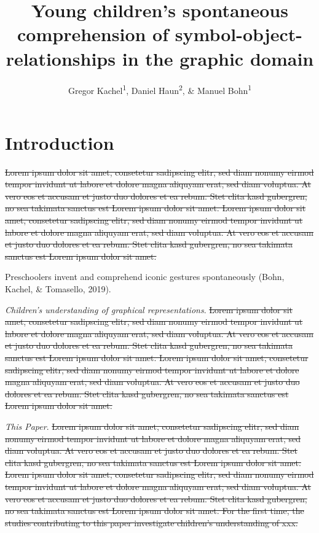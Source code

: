 \documentclass[
  man]{apa6}
\title{Young children's spontaneous comprehension of symbol-object-relationships in the graphic domain}
\author{Gregor Kachel\textsuperscript{1}, Daniel Haun\textsuperscript{2}, \& Manuel Bohn\textsuperscript{1}}
\date{}
\affiliation{\vspace{0.5cm}\textsuperscript{1} Leuphana University\\\textsuperscript{2} Max-Planck-Institute for Evolutionary Anthropology}
\begin{document}
\maketitle

\section{Introduction}\label{introduction}

\st{Lorem ipsum dolor sit amet, consetetur sadipscing elitr, sed diam nonumy eirmod tempor invidunt ut labore et dolore magna aliquyam erat, sed diam voluptua. At vero eos et accusam et justo duo dolores et ea rebum. Stet clita kasd gubergren, no sea takimata sanctus est Lorem ipsum dolor sit amet. Lorem ipsum dolor sit amet, consetetur sadipscing elitr, sed diam nonumy eirmod tempor invidunt ut labore et dolore magna aliquyam erat, sed diam voluptua. At vero eos et accusam et justo duo dolores et ea rebum. Stet clita kasd gubergren, no sea takimata sanctus est Lorem ipsum dolor sit amet.}

Preschoolers invent and comprehend iconic gestures spontaneously (Bohn, Kachel, \& Tomasello, 2019).

\emph{Children's understanding of graphical representations}.
\st{Lorem ipsum dolor sit amet, consetetur sadipscing elitr, sed diam nonumy eirmod tempor invidunt ut labore et dolore magna aliquyam erat, sed diam voluptua. At vero eos et accusam et justo duo dolores et ea rebum. Stet clita kasd gubergren, no sea takimata sanctus est Lorem ipsum dolor sit amet. Lorem ipsum dolor sit amet, consetetur sadipscing elitr, sed diam nonumy eirmod tempor invidunt ut labore et dolore magna aliquyam erat, sed diam voluptua. At vero eos et accusam et justo duo dolores et ea rebum. Stet clita kasd gubergren, no sea takimata sanctus est Lorem ipsum dolor sit amet.}

\emph{This Paper}.
\st{Lorem ipsum dolor sit amet, consetetur sadipscing elitr, sed diam nonumy eirmod tempor invidunt ut labore et dolore magna aliquyam erat, sed diam voluptua. At vero eos et accusam et justo duo dolores et ea rebum. Stet clita kasd gubergren, no sea takimata sanctus est Lorem ipsum dolor sit amet. Lorem ipsum dolor sit amet, consetetur sadipscing elitr, sed diam nonumy eirmod tempor invidunt ut labore et dolore magna aliquyam erat, sed diam voluptua. At vero eos et accusam et justo duo dolores et ea rebum. Stet clita kasd gubergren, no sea takimata sanctus est Lorem ipsum dolor sit amet. For the first time, the studies contributing to this paper investigate children's understanding of xxx.}
\end{document}
